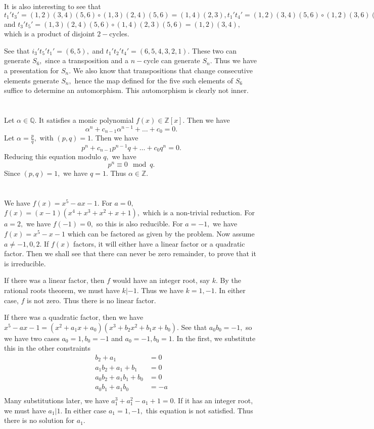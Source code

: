 \documentclass{article}
\begin{document}
It is also interesting to see that $t_1't_3'=(1 ,2)(3, 4)(5, 6)\circ (1, 3)(2, 4)(5 ,6)=(1 ,4)(2 ,3), t_1't_4'=(1 ,2)(3, 4)(5, 6)\circ (1 ,2) (3, 6) (4 ,5)= 
(3, 5 )(4 ,6), 
t_1't_5'=(1 ,2)(3, 4)(5, 6)\circ (1 ,4)(2, 3)(5, 6)= (1, 3)(2, 4), t_2't_4'=(1, 4)(2 ,5)(3, 6) \circ (1, 2) (3, 6) (4 ,5)=(1, 5)(2, 4), t_2't_5'=(1, 4)(2, 
5)(3, 6) \circ (1, 
4)(2, 3)(5 ,6)= (2 ,6)(3, 5),$ and $t_3't_5'= (1 ,3)(2, 4)(5, 6) \circ  (1 ,4)(2, 3)(5, 6)=(1 ,2)(3, 4),$ which is a product of disjoint $2-$cycles. 

See that $i_3't_5't_1'=(6,5),$ and $t_1't_2't_4'=(6,5,4,3,2,1).$ These two can generate $S_6,$ since a transposition and a $n-$cycle can generate $S_n.$
Thus we have a presentation for $S_n.$ We also know that transpositions that change consecutive elements generate $S_n,$ hence the map defined for the five 
such elements of $S_6$ suffice to determine an automorphism. This automorphism is clearly not inner.

\section{} %
Let $\alpha \in \mathbb{Q}.$ It satisfies a monic polynomial $f(x) \in \mathbb{Z}[x].$ Then we have $$\alpha^n + c_{n-1}\alpha^{n-1} + \dots + c_0=0.$$
Let $\alpha=\frac{p}{q},$ with $(p,q)=1.$ Then we have $$p^n + c_{n-1}p^{n-1}q + \dots + c_0q^n=0.$$ Reducing this equation modulo $q,$ we have 
$$p^n \equiv 0 \mod q.$$ Since $(p,q)=1,$ we have $q=1.$ Thus $\alpha \in \mathbb{Z}.$
\section{} %
We have $f(x)=x^5 -ax -1.$ For $a=0,$ $f(x)=(x-1)(x^4+x^3+x^2+x+1),$ which is a non-trivial reduction. For $a=2,$ we have $f(-1)=0,$ so this is also 
reducible. For $a=-1,$ we have $f(x)=x^5-x-1$ which can be factored as given by the problem. Now assume $a \neq -1,0,2.$  If $f(x)$ factors, it will either 
have a linear factor or a quadratic factor. Then we shall see that there can never be zero remainder, to prove that it is irreducible. 

If there was a linear factor, then $f$ would have an integer root, say $k$. By the rational roots theorem, we must have $k | -1.$ Thus we have $k= 1,-1.$ In 
either case, $f$ is not zero. Thus there is no linear factor. 

If there was a quadratic factor, then we have $x^5-ax-1 = (x^2 + a_1 x + a_0)(x^3 + b_2 x^2+ b_1 x + b_0).$ See that $a_0b_0 = -1,$ so we have two cases 
$a_0 =1, b_0 = -1$ and $a_0 = -1, b_0=1.$ In the first, we substitute this in the other constraints 
\begin{align*}
	b_2 + a_1 &= 0\\
	a_1b_2+ a_1 +b_1&= 0\\
	a_0b_2+a_1b_1+b_0 &=0\\
	a_0b_1 + a_1b_0 &= -a \\
\end{align*}  
Many substitutions later, we have $a_1^3 + a_1^2 -a_1 + 1=0.$ If it has an integer root, we must have $a_1 | 1.$ In either case $a_1 =1,-1,$ this equation 
is not satisfied. Thus there is no solution for $a_1.$
\end{document}
